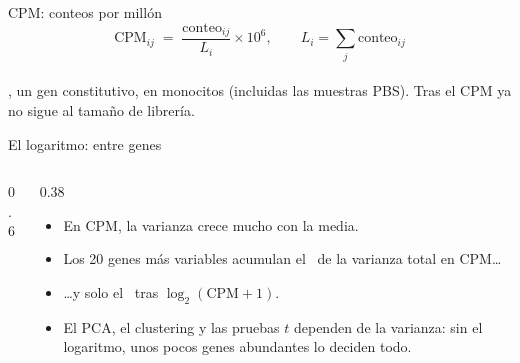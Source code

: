 \begin{frame}{CPM: conteos por millón}
  \[
    \text{CPM}_{ij}\;=\;\frac{\text{conteo}_{ij}}{L_i}\times 10^{6},\qquad L_i=\sum_{j}\text{conteo}_{ij}
  \]
  \centering
  \\[-2pt]
  \small {}, un gen constitutivo, en monocitos (incluidas las muestras PBS). Tras el CPM ya no sigue al tamaño de librería.
\end{frame}

\begin{frame}{El logaritmo: entre genes}
  \begin{columns}[c]
    \begin{column}{0.6\linewidth}
    \end{column}
    \begin{column}{0.38\linewidth}\small
      \begin{itemize}\setlength\itemsep{3pt}
        \item En CPM, la \alert{varianza crece mucho con la media}.
        \item Los 20 genes más variables acumulan el \numtoptwentycpm\ de la varianza total en CPM\ldots{}
        \item \ldots{}y solo el \numtoptwentylog\ tras $\log_2(\text{CPM}+1)$.
        \item El PCA, el clustering y las pruebas $t$ dependen de la varianza: sin el logaritmo, unos pocos genes abundantes lo deciden todo.
      \end{itemize}
    \end{column}
  \end{columns}
\end{frame}

